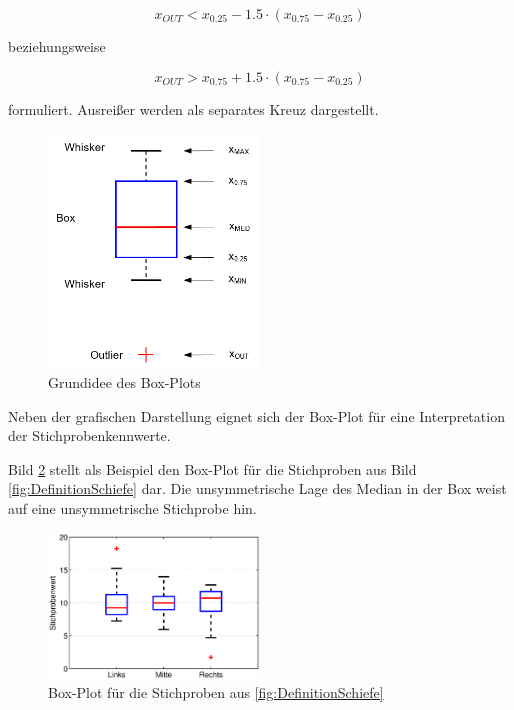 \begin{equation}\label{eq:threesixtysix}
x_{OUT} <x_{0.25} -1.5\cdot (x_{0.75} -x_{0.25})
\end{equation}

beziehungsweise 

\begin{equation}\label{eq:threesixtyseven}
x_{OUT} >x_{0.75} +1.5\cdot (x_{0.75} -x_{0.25})
\end{equation}

\noindent formuliert. Ausrei{\ss}er werden als separates Kreuz dargestellt. 

\clearpage

\noindent 
\begin{figure}[H]
  \centerline{\includegraphics[width=0.5\textwidth]{Kapitel3/Bilder/image12}}
  \caption{Grundidee des Box-Plots}
  \label{fig:Box-Plots}
\end{figure}

\noindent Neben der grafischen Darstellung eignet sich der Box-Plot f\"{u}r eine Interpretation der Stichprobenkennwerte. 

\noindent Bild \ref{fig:DefinitionSchiefeBoxPlot} stellt als Beispiel den Box-Plot f\"{u}r die Stichproben aus Bild \ref{fig:DefinitionSchiefe} dar. Die unsymmetrische Lage des Median in der Box weist auf eine unsymmetrische Stichprobe hin.

\noindent 
\begin{figure}[H]
  \centerline{\includegraphics[width=0.5\textwidth]{Kapitel3/Bilder/image13}}
  \caption{Box-Plot f\"{u}r die Stichproben aus \ref{fig:DefinitionSchiefe}}
  \label{fig:DefinitionSchiefeBoxPlot}
\end{figure}

